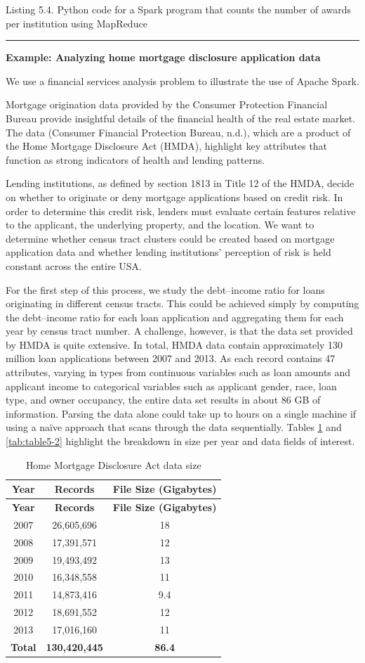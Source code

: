 \documentclass[]{krantz}
\begin{document}
Listing 5.4. Python code for a Spark program that counts the number of
awards per institution using MapReduce

\begin{center}\rule{0.5\linewidth}{\linethickness}\end{center}

\textbf{Example: Analyzing home mortgage disclosure application data}

We use a financial services analysis problem to illustrate the use of
Apache Spark.

Mortgage origination data provided by the Consumer Protection Financial
Bureau provide insightful details of the financial health of the real
estate market. The data (Consumer Financial Protection Bureau, n.d.),
which are a product of the Home Mortgage Disclosure Act (HMDA),
highlight key attributes that function as strong indicators of health
and lending patterns.

Lending institutions, as defined by section 1813 in Title 12 of the
HMDA, decide on whether to originate or deny mortgage applications based
on credit risk. In order to determine this credit risk, lenders must
evaluate certain features relative to the applicant, the underlying
property, and the location. We want to determine whether census tract
clusters could be created based on mortgage application data and whether
lending institutions' perception of risk is held constant across the
entire USA.

For the first step of this process, we study the debt--income ratio for
loans originating in different census tracts. This could be achieved
simply by computing the debt--income ratio for each loan application and
aggregating them for each year by census tract number. A challenge,
however, is that the data set provided by HMDA is quite extensive. In
total, HMDA data contain approximately 130 million loan applications
between 2007 and 2013. As each record contains 47 attributes, varying in
types from continuous variables such as loan amounts and applicant
income to categorical variables such as applicant gender, race, loan
type, and owner occupancy, the entire data set results in about 86 GB of
information. Parsing the data alone could take up to hours on a single
machine if using a naïve approach that scans through the data
sequentially. Tables \ref{tab:table5-1} and \ref{tab:table5-2} highlight
the breakdown in size per year and data fields of interest.

\begin{longtable}[]{@{}ccc@{}}
\caption{\label{tab:table5-1} Home Mortgage Disclosure Act data
size}\tabularnewline
\toprule
\textbf{Year} & \textbf{Records} & \textbf{File Size
(Gigabytes)}\tabularnewline
\midrule
\endfirsthead
\toprule
\textbf{Year} & \textbf{Records} & \textbf{File Size
(Gigabytes)}\tabularnewline
\midrule
\endhead
2007 & 26,605,696 & 18\tabularnewline
2008 & 17,391,571 & 12\tabularnewline
2009 & 19,493,492 & 13\tabularnewline
2010 & 16,348,558 & 11\tabularnewline
2011 & 14,873,416 & 9.4\tabularnewline
2012 & 18,691,552 & 12\tabularnewline
2013 & 17,016,160 & 11\tabularnewline
\textbf{Total} & \textbf{130,420,445} & \textbf{86.4}\tabularnewline
\bottomrule
\end{longtable}
\end{document}
